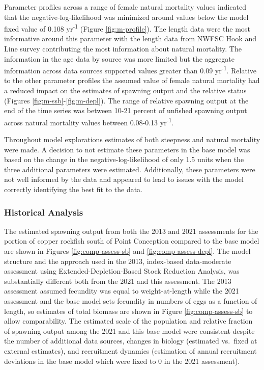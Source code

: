 \documentclass[11pt,
  english,
  letterpaper,
]{article}
\begin{document}
Parameter profiles across a range of female natural mortality values indicated that the negative-log-likelihood was minimized around values below the model fixed value of 0.108 yr\textsuperscript{-1} (Figure \ref{fig:m-profile}). The length data were the most informative around this parameter with the length data from NWFSC Hook and Line survey contributing the most information about natural mortality. The information in the age data by source was more limited but the aggregate information across data sources supported values greater than 0.09 yr\textsuperscript{-1}. Relative to the other parameter profiles the assumed value of female natural mortality had a reduced impact on the estimates of spawning output and the relative status (Figures \ref{fig:m-ssb}-\ref{fig:m-depl}). The range of relative spawning output at the end of the time series was between 10-21 percent of unfished spawning output across natural mortality values between 0.08-0.13 yr\textsuperscript{-1}.

Throughout model explorations estimates of both steepness and natural mortality were made. A decision to not estimate these parameters in the base model was based on the change in the negative-log-likelihood of only 1.5 units when the three additional parameters were estimated. Additionally, these parameters were not well informed by the data and appeared to lead to issues with the model correctly identifying the best fit to the data.

\hypertarget{historical-analysis}{%
\subsubsection{Historical Analysis}\label{historical-analysis}}

The estimated spawning output from both the 2013 and 2021 assessments for the portion of copper rockfish south of Point Conception compared to the base model are shown in Figures \ref{fig:comp-assess-sb} and \ref{fig:comp-assess-depl}. The model structure and the approach used in the 2013, index-based data-moderate assessment using Extended-Depletion-Based Stock Reduction Analysis, was substantially different both from the 2021 and this assessment. The 2013 assessment assumed fecundity was equal to weight-at-length while the 2021 assessment and the base model sets fecundity in numbers of eggs as a function of length, so estimates of total biomass are shown in Figure \ref{fig:comp-assess-sb} to allow comparability. The estimated scale of the population and relative fraction of spawning output among the 2021 and this base model were consistent despite the number of additional data sources, changes in biology (estimated vs.~fixed at external estimates), and recruitment dynamics (estimation of annual recruitment deviations in the base model which were fixed to 0 in the 2021 assessment).
\end{document}
